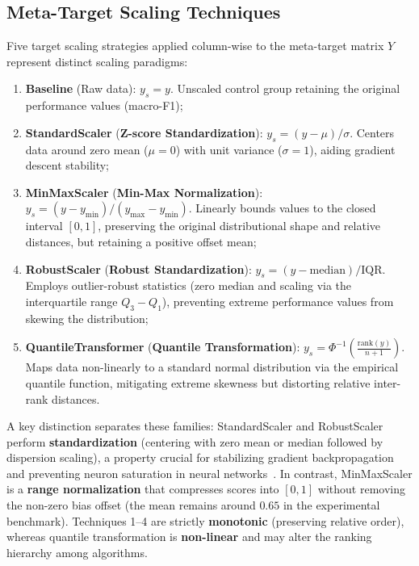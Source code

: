 \documentclass[12pt]{article}
\begin{document}
\subsection{Meta-Target Scaling Techniques}

Five target scaling strategies applied column-wise to the meta-target matrix $Y$ represent distinct scaling paradigms:
\begin{enumerate}
  \item \textbf{Baseline} (Raw data): $y_s = y$. Unscaled control group retaining the original performance values (macro-F1);
  \item \textbf{StandardScaler} (\textbf{Z-score Standardization}): $y_s = (y - \mu) / \sigma$. Centers data around zero mean ($\mu=0$) with unit variance ($\sigma=1$), aiding gradient descent stability;
  \item \textbf{MinMaxScaler} (\textbf{Min-Max Normalization}): $y_s = (y - y_{\min}) / (y_{\max} - y_{\min})$. Linearly bounds values to the closed interval $[0, 1]$, preserving the original distributional shape and relative distances, but retaining a positive offset mean;
  \item \textbf{RobustScaler} (\textbf{Robust Standardization}): $y_s = (y - \text{median}) / \text{IQR}$. Employs outlier-robust statistics (zero median and scaling via the interquartile range $Q_3 - Q_1$), preventing extreme performance values from skewing the distribution;
  \item \textbf{QuantileTransformer} (\textbf{Quantile Transformation}): $y_s = \Phi^{-1}\!\left( \frac{\text{rank}(y)}{n+1} \right)$. Maps data non-linearly to a standard normal distribution via the empirical quantile function, mitigating extreme skewness but distorting relative inter-rank distances.
\end{enumerate}

A key distinction separates these families: StandardScaler and RobustScaler perform \textbf{standardization} (centering with zero mean or median followed by dispersion scaling), a property crucial for stabilizing gradient backpropagation and preventing neuron saturation in neural networks~\cite{lecun2012efficient,glorot2010understanding}. In contrast, MinMaxScaler is a \textbf{range normalization} that compresses scores into $[0, 1]$ without removing the non-zero bias offset (the mean remains around $0.65$ in the experimental benchmark). Techniques 1--4 are strictly \textbf{monotonic} (preserving relative order), whereas quantile transformation is \textbf{non-linear} and may alter the ranking hierarchy among algorithms.
\end{document}
